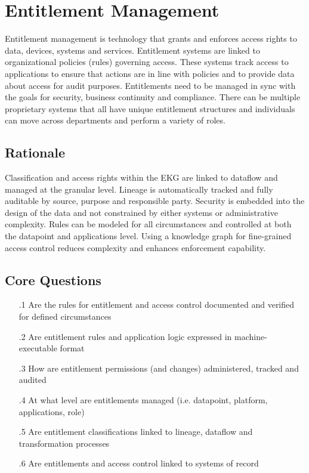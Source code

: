 \section{Entitlement Management}\label{sec:ekgmm-b-4-4} %

Entitlement management is technology that grants and enforces access rights to data, devices, systems and services.
Entitlement systems are linked to organizational policies (rules) governing access.
These systems track access to applications to ensure that actions are in line with policies and to provide data about access for audit purposes.
Entitlements need to be managed in sync with the goals for security, business continuity and compliance.
There can be multiple proprietary systems that all have unique entitlement structures and individuals can move across departments and perform a variety of roles.

\subsection*{ Rationale}

Classification and access rights within the EKG are linked to dataflow and managed at the granular level.  Lineage is automatically tracked and fully auditable by source, purpose and responsible party.  Security is embedded into the design of the data and not constrained by either systems or administrative complexity.  Rules can be modeled for all circumstances and controlled at both the datapoint and applications level.  Using a knowledge graph for fine-grained access control reduces complexity and enhances enforcement capability.

\subsection*{Core Questions}

\begin{itemize}[leftmargin=.5in]
  \item [\thesection.1] Are the rules for entitlement and access control documented and verified for defined circumstances
  \item [\thesection.2] Are entitlement rules and application logic expressed in machine-executable format
  \item [\thesection.3] How are entitlement permissions (and changes) administered, tracked and audited
  \item [\thesection.4] At what level are entitlements managed (i.e. datapoint, platform, applications, role)
  \item [\thesection.5] Are entitlement classifications linked to lineage, dataflow and transformation processes
  \item [\thesection.6] Are entitlements and access control linked to systems of record
\end{itemize}
